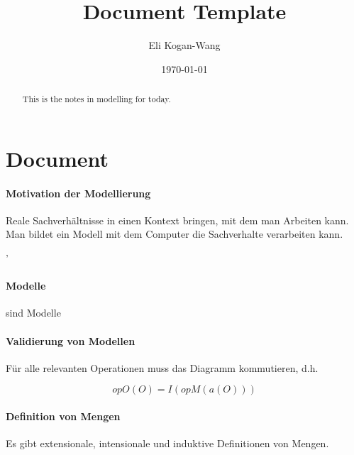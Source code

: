 \documentclass[a4paper,12pt]{article}
\title{Document Template}
\author{Eli Kogan-Wang}
\date{\today}
\begin{document}
\renewcommand{\abstractname}{Abstract}
\begin{abstract}
  This is the notes in modelling for today.
\end{abstract}
\section{Document}

\paragraph*{Motivation der Modellierung}

Reale Sachverhältnisse in einen Kontext bringen, mit dem man Arbeiten kann.
Man bildet ein Modell mit dem Computer die Sachverhalte verarbeiten kann.

'\paragraph*{Modelle} sind Modelle

\paragraph*{Validierung von Modellen}

Für alle relevanten Operationen muss das Diagramm kommutieren, d.h.

$$opO(O)=I(opM(a(O)))$$

\paragraph*{Definition von Mengen}

Es gibt extensionale, intensionale und induktive Definitionen von Mengen.
\end{document}
